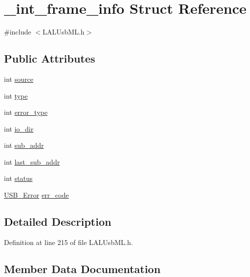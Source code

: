 \hypertarget{struct__int__frame__info}{}\section{\+\_\+int\+\_\+frame\+\_\+info Struct Reference}
\label{struct__int__frame__info}


{\ttfamily \#include $<$L\+A\+L\+Usb\+M\+L.\+h$>$}

\subsection*{Public Attributes}
\begin{DoxyCompactItemize}
\item 
int \hyperlink{struct__int__frame__info_aa1ce450da20558e8f163ad2fe94549a0}{source}
\item 
int \hyperlink{struct__int__frame__info_a4c4c7c961ca654d25894f2712acf8082}{type}
\item 
int \hyperlink{struct__int__frame__info_a1bec0ff5f853c91d7c1f942a313b3f04}{error\+\_\+type}
\item 
int \hyperlink{struct__int__frame__info_a25159adc4e751e8a9bb755171b256545}{io\+\_\+dir}
\item 
int \hyperlink{struct__int__frame__info_a97675d320269c758fdb640e1a935af66}{sub\+\_\+addr}
\item 
int \hyperlink{struct__int__frame__info_a939d145888f1c2264e2e980c07412efb}{last\+\_\+sub\+\_\+addr}
\item 
int \hyperlink{struct__int__frame__info_a0d9006b1b5b9fd5a5576e1cdb7e88c5b}{status}
\item 
\hyperlink{LALUsbML_8h_aa7e5a2302774d5aa1d48a2a1cfc46e86}{U\+S\+B\+\_\+\+Error} \hyperlink{struct__int__frame__info_a43e1a7c19fbc0d16e21dd9cb58f686e2}{err\+\_\+code}
\end{DoxyCompactItemize}


\subsection{Detailed Description}


Definition at line 215 of file L\+A\+L\+Usb\+M\+L.\+h.



\subsection{Member Data Documentation}
\mbox{\label{struct__int__frame__info_a43e1a7c19fbc0d16e21dd9cb58f686e2}} 

